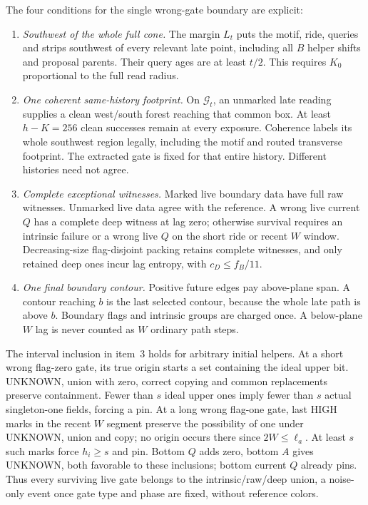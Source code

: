 The four conditions for the single wrong-gate boundary are explicit:
\begin{enumerate}
\item \emph{Southwest of the whole full cone.} The margin $L_t$ puts the motif, ride, queries and strips southwest of every relevant late point, including all $B$ helper shifts and proposal parents. Their query ages are at least $t/2$. This requires $K_0$ proportional to the full read radius.
\item \emph{One coherent same-history footprint.} On $\mathcal G_t$, an unmarked late reading supplies a clean west/south forest reaching that common box. At least $h-K=256$ clean successes remain at every exposure. Coherence labels its whole southwest region legally, including the motif and routed transverse footprint. The extracted gate is fixed for that entire history. Different histories need not agree.
\item \emph{Complete exceptional witnesses.} Marked live boundary data have full raw witnesses. Unmarked live data agree with the reference. A wrong live current $Q$ has a complete deep witness at lag zero; otherwise survival requires an intrinsic failure or a wrong live $Q$ on the short ride or recent $W$ window. Decreasing-size flag-disjoint packing retains complete witnesses, and only retained deep ones incur lag entropy, with $c_D\le f_B/11$.
\item \emph{One final boundary contour.} Positive future edges pay above-plane span. A contour reaching $b$ is the last selected contour, because the whole late path is above $b$. Boundary flags and intrinsic groups are charged once. A below-plane $W$ lag is never counted as $W$ ordinary path steps.
\end{enumerate}

The interval inclusion in item~3 holds for arbitrary initial helpers. At a short wrong flag-zero gate, its true origin starts a set containing the ideal upper bit. UNKNOWN, union with zero, correct copying and common replacements preserve containment. Fewer than $s$ ideal upper ones imply fewer than $s$ actual singleton-one fields, forcing a pin. At a long wrong flag-one gate, last HIGH marks in the recent $W$ segment preserve the possibility of one under UNKNOWN, union and copy; no origin occurs there since $2W\le\ell_a$. At least $s$ such marks force $h_i\ge s$ and pin. Bottom $Q$ adds zero, bottom $A$ gives UNKNOWN, both favorable to these inclusions; bottom current $Q$ already pins. Thus every surviving live gate belongs to the intrinsic/raw/deep union, a noise-only event once gate type and phase are fixed, without reference colors.

